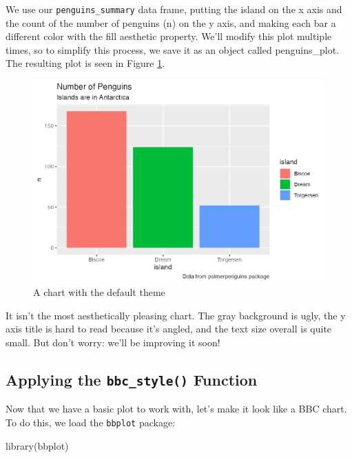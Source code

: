 \documentclass[
]{book}
\newenvironment{Shaded}{\begin{snugshade}}{\end{snugshade}}
\newcommand{\FunctionTok}[1]{\textcolor[rgb]{0.00,0.00,0.00}{#1}}
\newcommand{\NormalTok}[1]{#1}
\begin{document}
We use our \texttt{penguins\_summary} data frame, putting the island on the x axis and the count of the number of penguins (n) on the y axis, and making each bar a different color with the fill aesthetic property. We'll modify this plot multiple times, so to simplify this process, we save it as an object called penguins\_plot. The resulting plot is seen in Figure \ref{fig:basic-penguins-plot-plot}.

\begin{figure}
\includegraphics[width=1\linewidth]{custom-theme_files/figure-latex/basic-penguins-plot-plot-1} \caption{A chart with the default theme}\label{fig:basic-penguins-plot-plot}
\end{figure}

It isn't the most aesthetically pleasing chart. The gray background is ugly, the y axis title is hard to read because it's angled, and the text size overall is quite small. But don't worry: we'll be improving it soon!

\hypertarget{applying-the-bbc_style-function}{%
\subsection*{\texorpdfstring{Applying the \texttt{bbc\_style()} Function}{Applying the bbc\_style() Function}}\label{applying-the-bbc_style-function}}

Now that we have a basic plot to work with, let's make it look like a BBC chart. To do this, we load the \texttt{bbplot} package:

\begin{Shaded}
\begin{Highlighting}[]
\FunctionTok{library}\NormalTok{(bbplot)}
\end{Highlighting}
\end{Shaded}
\end{document}
